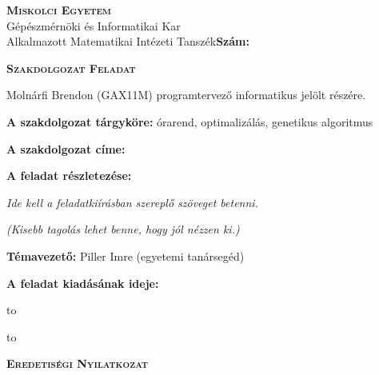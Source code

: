 \documentclass[12pt,a4paper]{report}
\begin{document}
\newpage

\pagestyle{empty}
\begin{flushleft}
\textsc{\bfseries Miskolci Egyetem}\\
Gépészmérnöki és Informatikai Kar\\
Alkalmazott Matematikai Intézeti Tanszék\hspace*{4cm}\hfil \textbf{Szám:}
\end{flushleft}
\vskip 0.5cm
\begin{center}
\large\textsc{\bfseries Szakdolgozat Feladat}
\end{center}
\vskip 0.5cm
Molnárfi Brendon (GAX11M) programtervező informatikus jelölt részére.\newline

\noindent\textbf{A szakdolgozat tárgyköre:} órarend, optimalizálás, genetikus algoritmus\newline

\noindent\textbf{A szakdolgozat címe:} \newline

\noindent\textbf{A feladat részletezése:}

\medskip

\emph{Ide kell a feladatkiírásban szereplő szöveget betenni.}

\medskip

\emph{(Kisebb tagolás lehet benne, hogy jól nézzen ki.)}

\vfill

\noindent\textbf{Témavezető:} Piller Imre (egyetemi tanársegéd) \newline


\noindent\textbf{A feladat kiadásának ideje:}\newline


\vskip 2cm

\hbox to 

\hbox to 

\newpage

\vspace*{1cm}  
\begin{center}
\large\textsc{\bfseries Eredetiségi Nyilatkozat}
\end{center}
\vspace*{2cm}  
\end{document}
